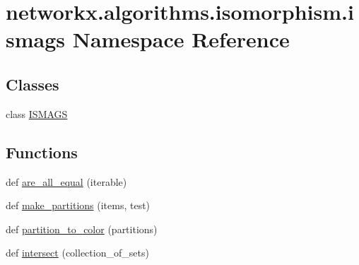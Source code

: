 \hypertarget{namespacenetworkx_1_1algorithms_1_1isomorphism_1_1ismags}{}\section{networkx.\+algorithms.\+isomorphism.\+ismags Namespace Reference}
\label{namespacenetworkx_1_1algorithms_1_1isomorphism_1_1ismags}
\subsection*{Classes}
\begin{DoxyCompactItemize}
\item 
class \hyperlink{classnetworkx_1_1algorithms_1_1isomorphism_1_1ismags_1_1ISMAGS}{I\+S\+M\+A\+GS}
\end{DoxyCompactItemize}
\subsection*{Functions}
\begin{DoxyCompactItemize}
\item 
def \hyperlink{namespacenetworkx_1_1algorithms_1_1isomorphism_1_1ismags_adeaeb2412166ed583ba1f5911656cd5e}{are\+\_\+all\+\_\+equal} (iterable)
\item 
def \hyperlink{namespacenetworkx_1_1algorithms_1_1isomorphism_1_1ismags_a8a0d10c0c3ce712095d568c54676d43b}{make\+\_\+partitions} (items, test)
\item 
def \hyperlink{namespacenetworkx_1_1algorithms_1_1isomorphism_1_1ismags_a9231036839a88c188ab79f4f2b123362}{partition\+\_\+to\+\_\+color} (partitions)
\item 
def \hyperlink{namespacenetworkx_1_1algorithms_1_1isomorphism_1_1ismags_aac307ece4bd5b6920883130d6f3c1145}{intersect} (collection\+\_\+of\+\_\+sets)
\end{DoxyCompactItemize}


